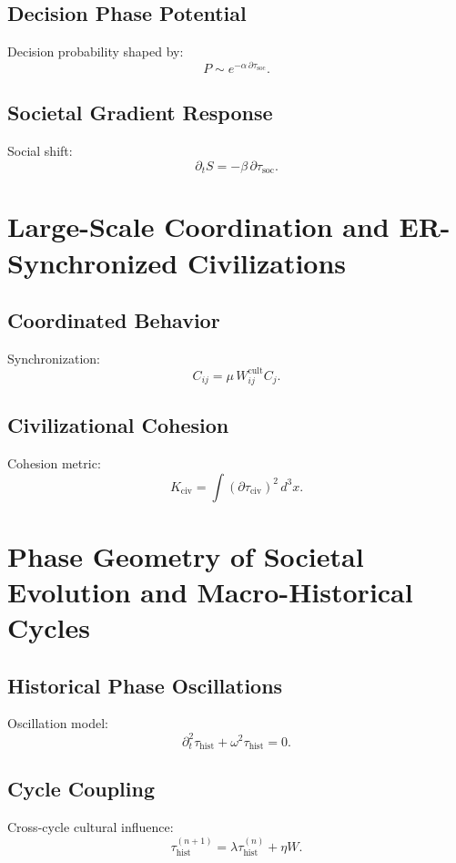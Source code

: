 \section{Decision Phase Potential}
Decision probability shaped by:
\[
P \sim e^{-\alpha\,\partial\tau_{\mathrm{soc}}}.
\]

\section{Societal Gradient Response}
Social shift:
\[
\partial_t S = -\beta\,\partial\tau_{\mathrm{soc}}.
\]

\chapter{Large-Scale Coordination and ER-Synchronized Civilizations}

\section{Coordinated Behavior}
Synchronization:
\[
C_{ij} = \mu\,W^{\mathrm{cult}}_{ij}C_j.
\]

\section{Civilizational Cohesion}
Cohesion metric:
\[
K_{\mathrm{civ}} = \int (\partial\tau_{\mathrm{civ}})^2\, d^3x.
\]

\chapter{Phase Geometry of Societal Evolution and Macro-Historical Cycles}

\section{Historical Phase Oscillations}
Oscillation model:
\[
\partial_t^2\tau_{\mathrm{hist}} + \omega^2\tau_{\mathrm{hist}} = 0.
\]

\section{Cycle Coupling}
Cross-cycle cultural influence:
\[
\tau_{\mathrm{hist}}^{(n+1)} = \lambda\tau_{\mathrm{hist}}^{(n)} + \eta W.
\]
